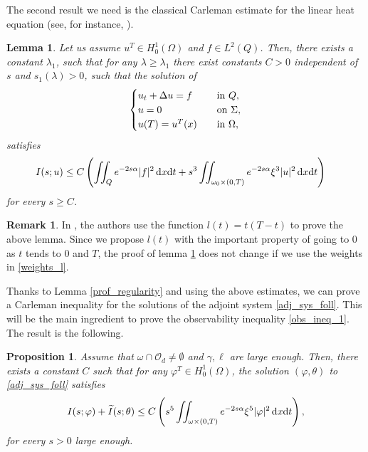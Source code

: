 \documentclass{aims}
\newtheorem{lemma}[theorem]{Lemma}
\newtheorem{proposition}{Proposition}
\theoremstyle{definition}
\newtheorem{remark}{Remark}
\def\dx{\,\textnormal{d}x}
\def\dt{\textnormal{d}t}
\begin{document}
The second result we need is the classical Carleman estimate for the linear heat equation (see, for instance, \cite{fursi,cara_guerrero}).
\begin{lemma}\label{2once}
Let us assume $u^T\in H_0^1(\Omega)$ and $f\in L^2(Q)$. Then, there exists a constant $\lambda_1$, such that for any $\lambda\geq \lambda_1$ there exist constants $C>0$ independent of $s$ and $s_1(\lambda)>0$, such that the solution of 
%
\begin{equation}\label{sys_u}
\begin{cases}
u_t+\Delta u=f \quad& \textnormal{in } Q, \\
u=0 \quad& \textnormal{on } \Sigma, \\
u(T)=u^T(x) \quad& \textnormal{in } \Omega,
\end{cases}
\end{equation}
%
satisfies
%
\begin{equation}\label{car_clasica}
\begin{split}
I(s;u)\leq C&\left(\iint_Qe^{-2s\alpha}|f|^2\dx\dt+s^3\iint_{\omega_0\times(0,T)}e^{-2s\alpha}\xi^3|u|^2\dx\dt\right)
\end{split}
\end{equation}
%
for every $s\geq C$. 
\end{lemma}
%
\begin{remark}
In \cite{fursi,cara_guerrero}, the authors use the function $l(t)=t(T-t)$ to prove the above lemma. Since we propose $l(t)$ with the important property of going to $0$ as $t$ tends to $0$ and $T$, the proof of lemma \ref{2once} does not change if we use the weights in \eqref{weights_l}.
\end{remark}

Thanks to Lemma \ref{prof_regularity} and using the above estimates, we can prove a Carleman inequality for the solutions of the adjoint system \eqref{adj_sys_foll}. This will be the main ingredient to prove the observability inequality \eqref{obs_ineq_1}. The result is the following.
%
\begin{proposition}\label{prop_carleman}
Assume that $\omega\cap\mathcal O_d\neq \emptyset$ and $\gamma,\ell$ are large enough. Then, there exists a constant $C$ such that for any $\varphi^T\in H^1_0(\Omega)$, the solution $(\varphi,\theta)$ to \eqref{adj_sys_foll} satisfies
%
\begin{equation}\label{car_final}
\begin{split}
I(s;\varphi)+\widetilde I(s;\theta) \leq C\left(s^5\iint_{\omega\times(0,T)}e^{-2s\alpha}\xi^5|\varphi|^2\dx\dt\right),
\end{split}
\end{equation}
%
for every $s>0$ large enough.
%
\end{proposition}
\end{document}
